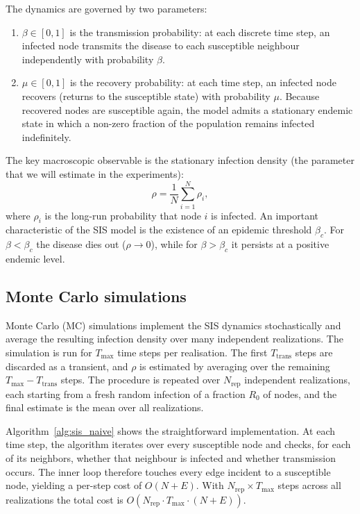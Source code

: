 \documentclass{article}
\begin{document}
The dynamics are governed by two parameters:
\begin{enumerate}
    \item $\beta \in [0,1]$ is the transmission probability: at each discrete time step, an infected node transmits the disease to each susceptible neighbour independently with probability $\beta$.
    \item $\mu \in [0,1]$ is the recovery probability: at each time step, an infected node recovers (returns to the susceptible state) with probability $\mu$. Because recovered nodes are susceptible again, the model admits a stationary endemic state in which a non-zero fraction of the population remains infected indefinitely.
\end{enumerate} 

The key macroscopic observable is the stationary infection density (the parameter that we will estimate in the experiments):
\begin{equation}
    \rho = \frac{1}{N}\sum_{i=1}^{N} \rho_i,
\end{equation}
where $\rho_i$ is the long-run probability that node $i$ is infected. An important characteristic of the SIS model is the existence of an epidemic threshold $\beta_c$. For $\beta < \beta_c$ the disease dies out ($\rho \to 0$), while for $\beta > \beta_c$ it persists at a positive endemic level.

\subsection{Monte Carlo simulations}

Monte Carlo (MC) simulations implement the SIS dynamics stochastically and average the resulting infection density over many independent realizations. The simulation is run for $T_{\max}$ time steps per realisation. The first $T_{\text{trans}}$ steps are discarded as a transient, and $\rho$ is estimated by averaging over the remaining $T_{\max} - T_{\text{trans}}$ steps. The procedure is repeated over $N_{\text{rep}}$ independent realizations, each starting from a fresh random infection of a fraction $R_0$ of nodes, and the final estimate is the mean over all realizations.

Algorithm~\ref{alg:sis_naive} shows the straightforward implementation. At each time step, the algorithm iterates over every susceptible node and checks, for each of its neighbors, whether that neighbour is infected and whether transmission occurs. The inner loop therefore touches every edge incident to a susceptible node, yielding a per-step cost of $O(N + E)$. With $N_{\text{rep}} \times T_{\max}$ steps across all realizations the total cost is $O(N_{\text{rep}} \cdot T_{\max} \cdot (N + E))$.
\end{document}
